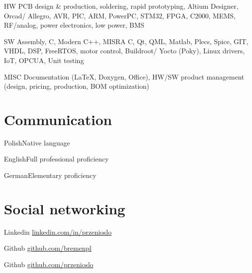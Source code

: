 \documentclass{tccv}
\begin{document}
\begin{factlist}

\item{HW}
     {PCB design \& production, soldering, rapid prototyping, Altium Designer, Orcad/ Allegro, AVR, PIC, ARM, PowerPC, STM32, FPGA, C2000, MEMS, RF/analog, power electronics, low power, BMS}

\item{SW}
     {Assembly, C, Modern C++, MISRA C, Qt, QML, Matlab, Plecs, Spice, GIT, VHDL, DSP, FreeRTOS, motor control, Buildroot/ Yocto (Poky), Linux drivers, IoT, OPCUA, Unit testing}
     
\item{MISC}
     {Documentation (\LaTeX, Doxygen, Office), HW/SW product management (design, pricing, production, BOM optimization)}

\end{factlist}

\section{Communication}

\begin{factlist}
\item{Polish}{Native language}
\item{English}{Full professional proficiency}
\item{German}{Elementary proficiency}
\end{factlist}

\section{Social networking}

\begin{factlist}

\item{Linkedin}
     {\href{http://pl.linkedin.com/in/przenioslo}{linkedin.com/in/przenioslo}}
     
\item{Github}
     {\href{http://github.com/bremenpl}{github.com/bremenpl}}
     
\item{Github}
     {\href{http://github.com/przenioslo}{github.com/przenioslo}}

\end{factlist} 

\vspace*{\fill} %
\end{document}
